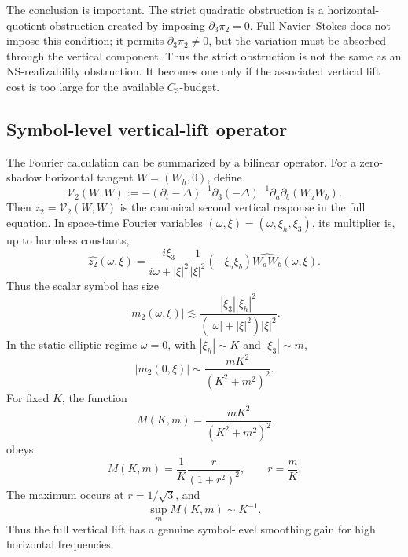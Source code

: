 \documentclass[11pt]{article}
\numberwithin{equation}{section}
\newcommand{\NS}{\mathrm{NS}}
\newcommand{\calV}{\mathcal V}
\begin{document}
The conclusion is important.  The strict quadratic obstruction is a horizontal-quotient obstruction created by imposing \(\partial_3\pi_2=0\).  Full Navier--Stokes does not impose this condition; it permits \(\partial_3\pi_2\ne0\), but the variation must be absorbed through the vertical component.  Thus the strict obstruction is not the same as an \(\NS\)-realizability obstruction.  It becomes one only if the associated vertical lift cost is too large for the available \(C_3\)-budget.

\subsection{Symbol-level vertical-lift operator}\label{subsec:symbol-vlift}

The Fourier calculation can be summarized by a bilinear operator.  For a zero-shadow horizontal tangent \(W=(W_h,0)\), define
\begin{equation}\label{eq:V2-operator}
\calV_2(W,W)
:=
-(\partial_t-\Delta)^{-1}
\partial_3(-\Delta)^{-1}
\partial_a\partial_b(W_aW_b).
\end{equation}
Then \(z_2=\calV_2(W,W)\) is the canonical second vertical response in the full equation.  In space-time Fourier variables \((\omega,\xi)=(\omega,\xi_h,\xi_3)\), its multiplier is, up to harmless constants,
\begin{equation}\label{eq:V2-symbol}
\widehat{z_2}(\omega,\xi)
=
\frac{i\xi_3}{i\omega+|\xi|^2}
\frac{1}{|\xi|^2}
(-\xi_a\xi_b)
\widehat{W_aW_b}(\omega,\xi).
\end{equation}
Thus the scalar symbol has size
\begin{equation}\label{eq:V2-symbol-size}
|m_2(\omega,\xi)|
\lesssim
\frac{|\xi_3||\xi_h|^2}{(|\omega|+|\xi|^2)|\xi|^2}.
\end{equation}
In the static elliptic regime \(\omega=0\), with \(|\xi_h|\sim K\) and \(|\xi_3|\sim m\),
\begin{equation}\label{eq:V2-static-size}
|m_2(0,\xi)|\sim \frac{mK^2}{(K^2+m^2)^2}.
\end{equation}
For fixed \(K\), the function
\[
M(K,m)=\frac{mK^2}{(K^2+m^2)^2}
\]
obeys
\[
M(K,m)=\frac1K\frac{r}{(1+r^2)^2},\qquad r=\frac mK.
\]
The maximum occurs at \(r=1/\sqrt3\), and
\begin{equation}\label{eq:V2-max-gain}
\sup_m M(K,m)\sim K^{-1}.
\end{equation}
Thus the full vertical lift has a genuine symbol-level smoothing gain for high horizontal frequencies.
\end{document}
